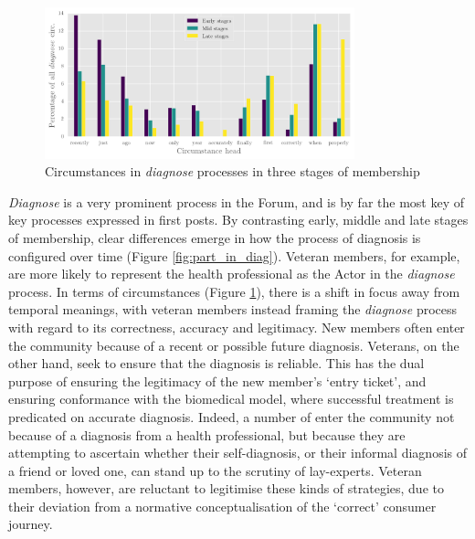     \begin{figure}[htb]
    \centering
    \includegraphics[width=0.8\textwidth]{../images/diag-circ.png}
    \caption[Circumstances in \emph{diagnose} processes]{Circumstances in \emph{diagnose} processes in three stages of membership}
    \label{fig:circ_in_diag}
    \end{figure}

\emph{Diagnose} is a very prominent process in the \gls{Forum}, and is by far the most key of key processes expressed in first \glspl{post}. By contrasting early, middle and late stages of membership, clear differences emerge in how the process of diagnosis is configured over time (Figure \ref{fig:part_in_diag}). Veteran \glspl{member}, for example, are more likely to represent the health professional as the Actor in the \emph{diagnose} process. In terms of circumstances (Figure \ref{fig:circ_in_diag}), there is a shift in focus away from temporal meanings, with veteran \glspl{member} instead framing the \emph{diagnose} process with regard to its correctness, accuracy and legitimacy. New \glspl{member} often enter the community because of a recent or possible future diagnosis. Veterans, on the other hand, seek to ensure that the diagnosis is reliable. This has the dual purpose of ensuring the legitimacy of the new member's `entry ticket', and ensuring conformance with the biomedical model, where successful treatment is predicated on accurate diagnosis. Indeed, a number of  enter the community not because of a diagnosis from a health professional, but because they are attempting to ascertain whether their self\hyp{}diagnosis, or their informal diagnosis of a friend or loved one, can stand up to the scrutiny of lay\hyp{}experts. Veteran members, however, are reluctant to legitimise these kinds of strategies, due to their deviation from a normative conceptualisation of the `correct' consumer journey.


